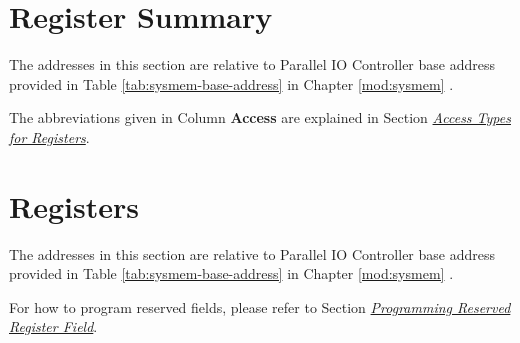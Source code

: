 \documentclass[main\_\_EN.tex]{subfiles}
\begin{document}



\newpage
\hypertarget{parlio-reg-summ}{}
\section{Register Summary}
\label{sec:parlio-reg-summ}

The addresses in this section are relative to Parallel IO Controller base address provided in Table \ref{tab:sysmem-base-address} in Chapter \ref{mod:sysmem} \textit{}.

The abbreviations given in Column \textbf{Access} are explained in Section \hyperref[glossary-access-types]{\textit{Access Types for Registers}}.






\newpage
\section{Registers}

The addresses in this section are relative to Parallel IO Controller base address provided in Table \ref{tab:sysmem-base-address} in Chapter \ref{mod:sysmem} \textit{}.

For how to program reserved fields, please refer to Section \hyperref[programming-reserved-field]{\textit{Programming Reserved Register Field}}.


\end{document}
